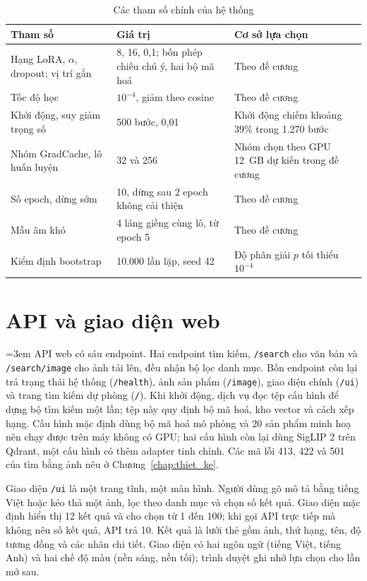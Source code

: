 \begin{table}[H]
\centering
\caption{Các tham số chính của hệ thống}
\label{tab:c4_thamso}
\footnotesize
\renewcommand{\arraystretch}{1.1}
\begin{tabularx}{\textwidth}{@{}p{5.2cm} p{4.6cm} X@{}}
\toprule
\textbf{Tham số} & \textbf{Giá trị} & \textbf{Cơ sở lựa chọn} \\
\midrule
Hạng LoRA, $\alpha$, dropout; vị trí gắn & 8, 16, 0,1; bốn phép chiếu chú ý, hai bộ mã hoá & Theo đề cương \\
Tốc độ học & $10^{-4}$, giảm theo cosine & Theo đề cương \\
Khởi động, suy giảm trọng số & 500 bước, 0,01 & Khởi động chiếm khoảng 39\% trong 1.270 bước \\
Nhóm GradCache, lô huấn luyện & 32 và 256 & Nhóm chọn theo GPU 12~GB dự kiến trong đề cương \\
Số epoch, dừng sớm & 10, dừng sau 2 epoch không cải thiện & Theo đề cương \\
Mẫu âm khó & 4 láng giềng cùng lô, từ epoch 5 & Theo đề cương \\
Kiểm định bootstrap & 10.000 lần lặp, seed 42 & Độ phân giải $p$ tối thiểu $10^{-4}$ \\
\bottomrule
\end{tabularx}
\end{table}

\section{API và giao diện web}
\label{sec:api-giao-dien}

{\emergencystretch=3em API web có sáu endpoint. Hai endpoint tìm kiếm, \texttt{/search} cho văn bản và \texttt{/search/image} cho ảnh tải lên, đều nhận bộ lọc danh mục. Bốn endpoint còn lại trả trạng thái hệ thống (\texttt{/health}), ảnh sản phẩm (\texttt{/image}), giao diện chính (\texttt{/ui}) và trang tìm kiếm dự phòng (\texttt{/}). Khi khởi động, dịch vụ đọc tệp cấu hình để dựng bộ tìm kiếm một lần; tệp này quy định bộ mã hoá, kho vector và cách xếp hạng. Cấu hình mặc định dùng bộ mã hoá mô phỏng và 20 sản phẩm minh hoạ nên chạy được trên máy không có GPU; hai cấu hình còn lại dùng SigLIP 2 trên Qdrant, một cấu hình có thêm adapter tinh chỉnh. Các mã lỗi 413, 422 và 501 của tìm bằng ảnh nêu ở Chương~\ref{chap:thiet_ke}.\par}

Giao diện \texttt{/ui} là một trang tĩnh, một màn hình. Người dùng gõ mô tả bằng tiếng Việt hoặc kéo thả một ảnh, lọc theo danh mục và chọn số kết quả. Giao diện mặc định hiển thị 12 kết quả và cho chọn từ 1 đến 100; khi gọi API trực tiếp mà không nêu số kết quả, API trả 10. Kết quả là lưới thẻ gồm ảnh, thứ hạng, tên, độ tương đồng và các nhãn chi tiết. Giao diện có hai ngôn ngữ (tiếng Việt, tiếng Anh) và hai chế độ màu (nền sáng, nền tối); trình duyệt ghi nhớ lựa chọn cho lần mở sau.

